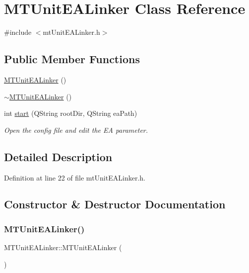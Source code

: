 \hypertarget{class_m_t_unit_e_a_linker}{}\section{M\+T\+Unit\+E\+A\+Linker Class Reference}
\label{class_m_t_unit_e_a_linker}


{\ttfamily \#include $<$mt\+Unit\+E\+A\+Linker.\+h$>$}

\subsection*{Public Member Functions}
\begin{DoxyCompactItemize}
\item 
\mbox{\hyperlink{class_m_t_unit_e_a_linker_aed54a414af8bd724598a620e60e0ed08}{M\+T\+Unit\+E\+A\+Linker}} ()
\item 
\mbox{\hyperlink{class_m_t_unit_e_a_linker_ac9e5096b4e07298672b442e28ea96880}{$\sim$\+M\+T\+Unit\+E\+A\+Linker}} ()
\item 
int \mbox{\hyperlink{class_m_t_unit_e_a_linker_acf164d0bb5d6769c83832fdcfb45d763}{start}} (Q\+String root\+Dir, Q\+String ea\+Path)
\begin{DoxyCompactList}\small\item\em Open the config file and edit the EA parameter. \end{DoxyCompactList}\end{DoxyCompactItemize}


\subsection{Detailed Description}


Definition at line 22 of file mt\+Unit\+E\+A\+Linker.\+h.



\subsection{Constructor \& Destructor Documentation}
\mbox{\label{class_m_t_unit_e_a_linker_aed54a414af8bd724598a620e60e0ed08}} 
\subsubsection{\texorpdfstring{M\+T\+Unit\+E\+A\+Linker()}{MTUnitEALinker()}}
{\footnotesize\ttfamily M\+T\+Unit\+E\+A\+Linker\+::\+M\+T\+Unit\+E\+A\+Linker (\begin{DoxyParamCaption}{ }\end{DoxyParamCaption})\hspace{0.3cm}{\ttfamily [inline]}}



